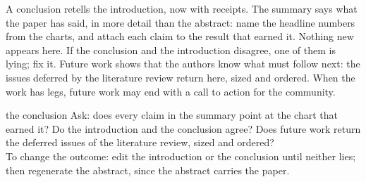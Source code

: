 A conclusion retells the introduction, now with receipts.
The summary says what the paper has said, in more detail than
the abstract: name the headline numbers from the charts, and
attach each claim to the result that earned it.
Nothing new appears here.
If the conclusion and the introduction disagree, one of them is
lying; fix it.
Future work shows that the authors know what must follow next:
the issues deferred by the literature review return here, sized
and ordered.
When the work has legs, future work may end with a call to
action for the community.

\begin{pause}{the conclusion}
Ask: does every claim in the summary point at the chart that
earned it?
Do the introduction and the conclusion agree?
Does future work return the deferred issues of the literature
review, sized and ordered?\\[0.2em]
To change the outcome: edit the introduction or the conclusion
until neither lies; then regenerate the abstract, since the
abstract carries the paper.
\end{pause}
